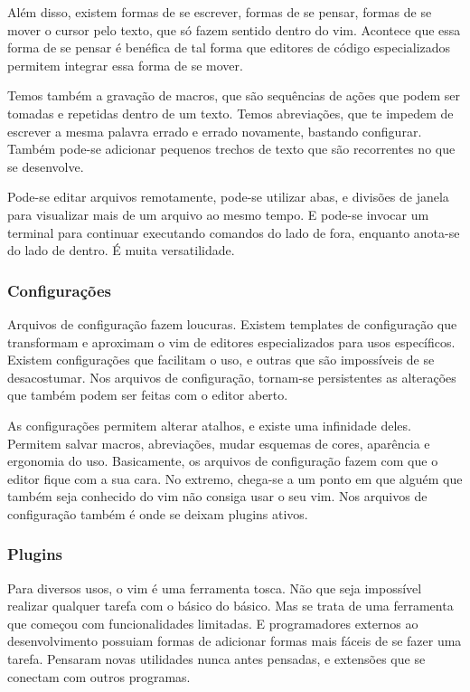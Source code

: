 \documentclass[a4paper, 12pt]{article}
\begin{document}
Além disso, existem formas de se escrever, formas de se pensar, formas de se mover o cursor pelo texto, que só fazem sentido dentro do vim.
Acontece que essa forma de se pensar é benéfica de tal forma que editores de código especializados permitem integrar essa forma de se mover.

Temos também a gravação de macros, que são sequências de ações que podem ser tomadas e repetidas dentro de um texto.
Temos abreviações, que te impedem de escrever a mesma palavra errado e errado novamente, bastando configurar.
Também pode-se adicionar pequenos trechos de texto que são recorrentes no que se desenvolve.

Pode-se editar arquivos remotamente, pode-se utilizar abas, e divisões de janela para visualizar mais de um arquivo ao mesmo tempo.
E pode-se invocar um terminal para continuar executando comandos do lado de fora, enquanto anota-se do lado de dentro.
É muita versatilidade.

\subsubsection{Configurações}
Arquivos de configuração fazem loucuras.
Existem templates de configuração que transformam e aproximam o vim de editores especializados para usos específicos.
Existem configurações que facilitam o uso, e outras que são impossíveis de se desacostumar.
Nos arquivos de configuração, tornam-se persistentes as alterações que também podem ser feitas com o editor aberto.

As configurações permitem alterar atalhos, e existe uma infinidade deles.
Permitem salvar macros, abreviações, mudar esquemas de cores, aparência e ergonomia do uso.
Basicamente, os arquivos de configuração fazem com que o editor fique com a sua cara.
No extremo, chega-se a um ponto em que alguém que também seja conhecido do vim não consiga usar o seu vim. Nos arquivos de configuração também é onde se deixam plugins ativos.

\subsubsection{Plugins}
Para diversos usos, o vim é uma ferramenta tosca.
Não que seja impossível realizar qualquer tarefa com o básico do básico.
Mas se trata de uma ferramenta que começou com funcionalidades limitadas.
E programadores externos ao desenvolvimento possuiam formas de adicionar formas mais fáceis de se fazer uma tarefa.
Pensaram novas utilidades nunca antes pensadas, e extensões que se conectam com outros programas.
\end{document}
